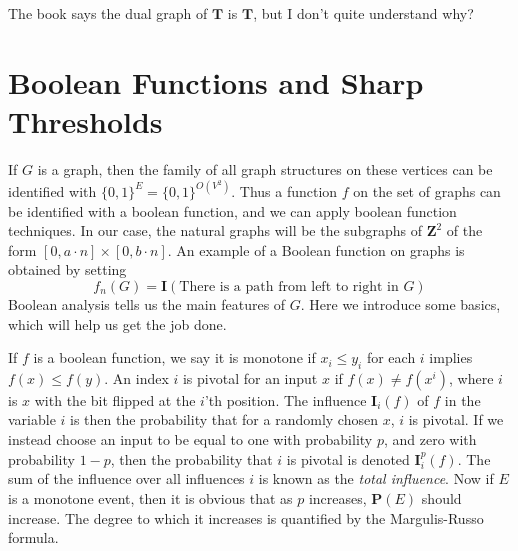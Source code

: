 The book says the dual graph of $\mathbf{T}$ is $\mathbf{T}$, but I don't quite understand why?

\section{Boolean Functions and Sharp Thresholds}

If $G$ is a graph, then the family of all graph structures on these vertices can be identified with $\{ 0, 1 \}^E = \{ 0, 1 \}^{O(V^2)}$. Thus a function $f$ on the set of graphs can be identified with a boolean function, and we can apply boolean function techniques. In our case, the natural graphs will be the subgraphs of $\mathbf{Z}^2$ of the form $[0, a \cdot n] \times [0, b \cdot n]$. An example of a Boolean function on graphs is obtained by setting
%
\[ f_n(G) = \mathbf{I}(\text{There is a path from left to right in $G$}) \]
%
Boolean analysis tells us the main features of $G$. Here we introduce some basics, which will help us get the job done.

If $f$ is a boolean function, we say it is monotone if $x_i \leq y_i$ for each $i$ implies $f(x) \leq f(y)$. An index $i$ is pivotal for an input $x$ if $f(x) \neq f(x^i)$, where $i$ is $x$ with the bit flipped at the $i$'th position. The influence $\mathbf{I}_i(f)$ of $f$ in the variable $i$ is then the probability that for a randomly chosen $x$, $i$ is pivotal. If we instead choose an input to be equal to one with probability $p$, and zero with probability $1 - p$, then the probability that $i$ is pivotal is denoted $\mathbf{I}_i^p(f)$. The sum of the influence over all influences $i$ is known as the {\it total influence}. Now if $E$ is a monotone event, then it is obvious that as $p$ increases, $\mathbf{P}(E)$ should increase. The degree to which it increases is quantified by the Margulis-Russo formula.

